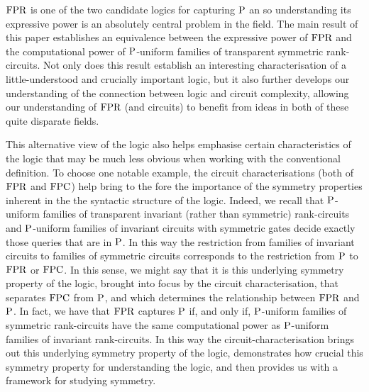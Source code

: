 \documentclass[../paper.tex]{subfiles}
\begin{document}
$\text{\upshape FPR}$ is one of the two candidate logics for capturing $\mathrm{P}$ an so
understanding its expressive power is an absolutely central problem in the
field. The main result of this paper establishes an equivalence between the
expressive power of $\text{\upshape FPR}$ and the computational power of $\mathrm{P}$-uniform families
of transparent symmetric rank-circuits. Not only does this result establish an
interesting characterisation of a little-understood and crucially important
logic, but it also further develops our understanding of the connection between
logic and circuit complexity, allowing our understanding of $\text{\upshape FPR}$ (and
circuits) to benefit from ideas in both of these quite disparate fields.

This alternative view of the logic also helps emphasise certain characteristics
of the logic that may be much less obvious when working with the conventional
definition. To choose one notable example, the circuit characterisations (both
of $\text{\upshape FPR}$ and $\text{\upshape FPC}$) help bring to the fore the importance of the symmetry
properties inherent in the the syntactic structure of the logic. Indeed, we
recall that $\mathrm{P}$-uniform families of transparent invariant (rather than
symmetric) rank-circuits and $\mathrm{P}$-uniform families of invariant circuits with
symmetric gates decide exactly those queries that are in $\mathrm{P}$. In this way the
restriction from families of invariant circuits to families of symmetric
circuits corresponds to the restriction from $\mathrm{P}$ to $\text{\upshape FPR}$ or $\text{\upshape FPC}$. In this
sense, we might say that it is this underlying symmetry property of the logic,
brought into focus by the circuit characterisation, that separates $\text{\upshape FPC}$ from
$\mathrm{P}$, and which determines the relationship between $\text{\upshape FPR}$ and $\mathrm{P}$. In fact,
we have that $\text{\upshape FPR}$ captures $\mathrm{P}$ if, and only if, $\mathrm{P}$-uniform families of
symmetric rank-circuits have the same computational power as $\mathrm{P}$-uniform
families of invariant rank-circuits. In this way the circuit-characterisation
brings out this underlying symmetry property of the logic, demonstrates how
crucial this symmetry property for understanding the logic, and then provides us
with a framework for studying symmetry.


\end{document}
